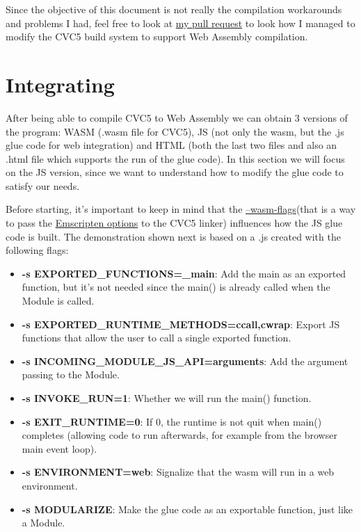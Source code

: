 \documentclass[12pt, a4paper]{article}
\begin{document}
Since the objective of this document is not really the compilation workarounds and problems I had, feel free to look at \href{https://github.com/cvc5/cvc5/pull/9006}{my pull request} to look how I managed to modify the CVC5 build system to support Web Assembly compilation.

\section{Integrating}
After being able to compile CVC5 to Web Assembly we can obtain 3 versions of the program: WASM (.wasm file for CVC5), JS (not only the wasm, but the .js glue code for web integration) and HTML (both the last two files and also an .html file which supports the run of the glue code). In this section we will focus on the JS version, since we want to understand how to modify the glue code to satisfy our needs.

Before starting, it's important to keep in mind that the \href{https://github.com/cvc5/cvc5/blob/main/configure.sh}{--wasm-flags}(that is a way to pass the \href{https://github.com/emscripten-core/emscripten/blob/main/src/settings.js}{Emscripten options} to the CVC5 linker) influences how the JS glue code is built. The demonstration shown next is based on a .js created with the following flags:
\begin{itemize}
    \item \textbf{-s EXPORTED\_FUNCTIONS=\_main}: Add the main as an exported function, but it's not needed since the main() is already called when the Module is called.
    \item \textbf{-s EXPORTED\_RUNTIME\_METHODS=ccall,cwrap}: Export JS functions that allow the user to call a single exported function.
    \item \textbf{-s INCOMING\_MODULE\_JS\_API=arguments}: Add the argument passing to the Module.
    \item \textbf{-s INVOKE\_RUN=1}: Whether we will run the main() function.
    \item \textbf{-s EXIT\_RUNTIME=0}: If 0, the runtime is not quit when main() completes (allowing code to run afterwards, for example from the browser main event loop).
    \item \textbf{-s ENVIRONMENT=web}: Signalize that the wasm will run in a web environment.
    \item \textbf{-s MODULARIZE}: Make the glue code as an exportable function, just like a Module.
\end{itemize}
\end{document}
